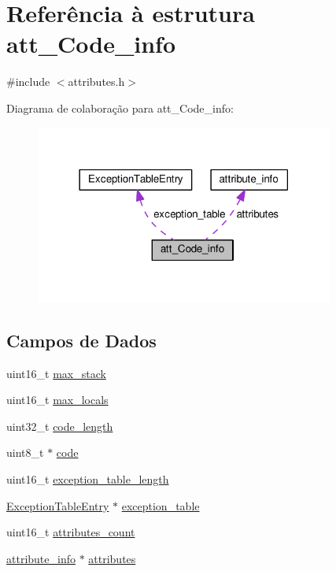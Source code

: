 \hypertarget{structatt__Code__info}{}\section{Referência à estrutura att\+\_\+\+Code\+\_\+info}
\label{structatt__Code__info}


{\ttfamily \#include $<$attributes.\+h$>$}



Diagrama de colaboração para att\+\_\+\+Code\+\_\+info\+:\nopagebreak
\begin{figure}[H]
\begin{center}
\leavevmode
\includegraphics[width=278pt]{structatt__Code__info__coll__graph}
\end{center}
\end{figure}
\subsection*{Campos de Dados}
\begin{DoxyCompactItemize}
\item 
uint16\+\_\+t \hyperlink{structatt__Code__info_aa2d5de07b8832d1cd18a3e4779348fe3}{max\+\_\+stack}
\item 
uint16\+\_\+t \hyperlink{structatt__Code__info_acc9a5f7316ef5c5e051f88646bacf445}{max\+\_\+locals}
\item 
uint32\+\_\+t \hyperlink{structatt__Code__info_a24832826292dff47147e23f9d440bd2a}{code\+\_\+length}
\item 
uint8\+\_\+t $\ast$ \hyperlink{structatt__Code__info_a8fb8f2fa609ccf1786492efca32d3be9}{code}
\item 
uint16\+\_\+t \hyperlink{structatt__Code__info_aacd07775342d4f5ace7485e36e2e5e3b}{exception\+\_\+table\+\_\+length}
\item 
\hyperlink{structExceptionTableEntry}{Exception\+Table\+Entry} $\ast$ \hyperlink{structatt__Code__info_af5c5d84bb1f725dc949981cc752c45d2}{exception\+\_\+table}
\item 
uint16\+\_\+t \hyperlink{structatt__Code__info_a9bed6599acdfbf0b3391c827272a5502}{attributes\+\_\+count}
\item 
\hyperlink{structattribute__info}{attribute\+\_\+info} $\ast$ \hyperlink{structatt__Code__info_a09d52ef82f22bf27c4b5e3f2ab021f79}{attributes}
\end{DoxyCompactItemize}


